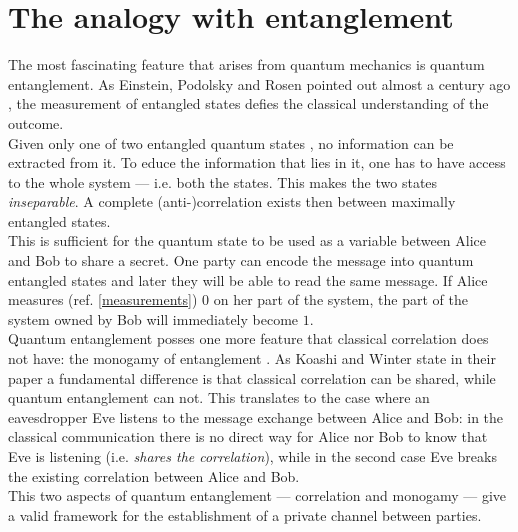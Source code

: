 \section{The analogy with entanglement}
	The most fascinating feature that arises from quantum mechanics is quantum entanglement. As Einstein, Podolsky and Rosen pointed out almost a century ago \cite{einstein1935}, 
	the measurement of entangled states defies the classical understanding of the outcome. \\
	Given only one of two entangled quantum states \footnotemark ,  no information can be extracted from it. 
	To educe the information that lies in it, one has to have access to the whole system --- i.e. both the states. 
	This makes the two states \emph{inseparable}. 
	A complete (anti-)correlation exists then between maximally entangled states.\\
	 This is sufficient for the quantum state to be used as a variable between Alice and Bob to share a secret. 
	 One party can encode the message into quantum entangled states and later they will be able to read the same message.
	If Alice measures (ref. \ref{measurements}) $0$ on her part of the system, the part of the system owned by Bob will immediately become $1$.\\
	Quantum entanglement posses one more feature that classical correlation does not have: the monogamy of entanglement \cite{KW04}. 
	As Koashi and Winter state in their paper a fundamental difference is that classical correlation can be shared, while quantum entanglement can not. 
	This translates to the case where an eavesdropper Eve listens to the message exchange between Alice and Bob: in the classical communication there is no direct way for Alice nor Bob to know that Eve is listening (i.e. \textit{shares the correlation}), while in the second case Eve breaks the existing correlation between Alice and Bob.\\
This two aspects of quantum entanglement --- correlation and monogamy --- give a valid framework for the establishment of a private channel between parties.
	
%			
		
